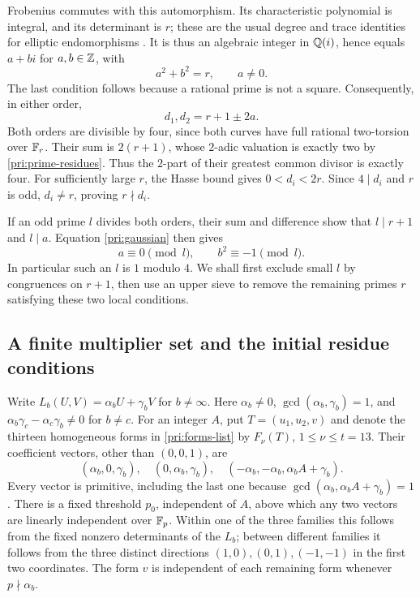 Frobenius commutes with this automorphism.  Its characteristic polynomial
is integral, and its determinant is $r$; these are the usual degree and
trace identities for elliptic endomorphisms
\cite[Proposition III.8.6 and Chapter V, \S2]{Silverman2009}.
It is thus an algebraic integer in $\mathbb Q(i)$, hence equals $a+bi$ for
$a,b\in\mathbb Z$, with
\begin{equation}\label{pri:gaussian}
                    a^2+b^2=r,\qquad a\ne0.
\end{equation}
The last condition follows because a rational prime is not a square.
Consequently, in either order,
\begin{equation}\label{pri:orders}
                            d_1,d_2=r+1\pm2a.
\end{equation}
Both orders are divisible by four, since both curves have full rational
two-torsion over $\mathbb F_r$.  Their sum is $2(r+1)$, whose $2$-adic valuation
is exactly two by \eqref{pri:prime-residues}.  Thus the $2$-part of their
greatest common divisor is exactly four.  For sufficiently large $r$,
the Hasse bound gives $0<d_i<2r$.  Since $4\mid d_i$ and $r$ is odd,
$d_i\ne r$, proving $r\nmid d_i$.

If an odd prime $l$ divides both orders, their sum and difference show
that $l\mid r+1$ and $l\mid a$.  Equation \eqref{pri:gaussian} then gives
\begin{equation}\label{pri:bad-classes}
                    a\equiv0\pmod l,\qquad
                    b^2\equiv-1\pmod l.
\end{equation}
In particular such an $l$ is $1$ modulo $4$.  We shall first exclude
small $l$ by congruences on $r+1$, then use an upper sieve to remove the
remaining primes $r$ satisfying these two local conditions.

\subsection{A finite multiplier set and the initial residue conditions}

Write $L_b(U,V)=\alpha_bU+\gamma_bV$ for $b\ne\infty$.
Here $\alpha_b\ne0$, $\gcd(\alpha_b,\gamma_b)=1$, and
$\alpha_b\gamma_c-\alpha_c\gamma_b\ne0$ for $b\ne c$.
For an integer $A$, put $T=(u_1,u_2,v)$ and denote the thirteen
homogeneous forms in \eqref{pri:forms-list} by $F_\nu(T)$,
$1\le\nu\le t=13$. Their coefficient vectors, other than $(0,0,1)$,
are
\[
 (\alpha_b,0,\gamma_b),\quad
 (0,\alpha_b,\gamma_b),\quad
 (-\alpha_b,-\alpha_b,\alpha_bA+\gamma_b).
\]
Every vector is primitive, including the last one because
$\gcd(\alpha_b,\alpha_bA+\gamma_b)=1$. There is a fixed threshold
$p_0$, independent of $A$, above which any two vectors are linearly
independent over $\mathbb F_p$. Within one of the three families this follows
from the fixed nonzero determinants of the $L_b$; between different
families it follows from the three distinct directions
$(1,0),(0,1),(-1,-1)$ in the first two coordinates. The form $v$ is
independent of each remaining form whenever $p\nmid\alpha_b$.

